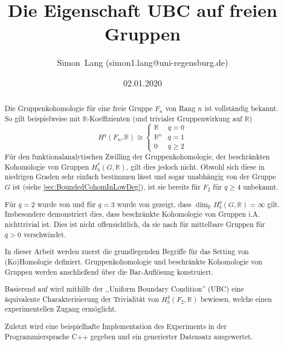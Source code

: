 \documentclass[a4paper,twoside,10pt]{scrreprt}
\author{Simon~Lang (\textsf{simon1.lang@uni-regensburg.de})}
\date{02.01.2020}
\title{Die Eigenschaft UBC auf freien Gruppen}
\newcommand{\R}{\mathbb{R}}
\theoremstyle{definition}
\begin{document}
\maketitle
\begin{abstract}
Die Gruppenkohomologie für eine freie Gruppe $F_n$ von Rang $n$ ist vollständig bekannt. So gilt beispielweise mit $\R$-Koeffizienten (und trivialer Gruppenwirkung auf $\R$)
\begin{equation*}
H^q(F_n,\R)\cong
\begin{cases} 
      \R & q=0 \\
      \R^n & q=1 \\
      0 & q\geq 2
\end{cases}
\end{equation*}
Für den funktionalanalytischen Zwilling der Gruppenkohomologie, der beschränkten Kohomologie von Gruppen $H_b^*(G,\R)$, gilt dies jedoch nicht. Obwohl sich diese in niedrigen Graden sehr einfach bestimmen lässt und sogar unabhängig von der Gruppe $G$ ist (siehe \cref{sec:BoundedCohomInLowDeg}), ist sie bereits für $F_2$ für $q\geq 4$ unbekannt. \par
Für $q=2$ wurde von \autocite{mitsumatsu} und für $q=3$ wurde von \autocite{soma} gezeigt, dass $\dim_{\R} H_b^q(G,\R)=\infty$ gilt. Insbesondere demonstriert dies, dass beschränkte Kohomologie von Gruppen i.A. nichttrivial ist. Dies ist nicht offensichtlich, da sie nach \cite{gromov} für mittelbare Gruppen für $q>0$ verschwindet.\par
In dieser Arbeit werden zuerst die grundlegenden Begriffe für das  Setting von (Ko)Homologie definiert. Gruppenkohomologie und beschränkte Kohomologie von Gruppen werden anschließend über die Bar-Auflösung konstruiert.\par
Basierend auf \cite[Theorem 2.8]{matsumoto} wird mithilfe der ,,Uniform Boundary Condition'' (UBC) eine äquivalente Charakterisierung der Trivialität von $H_b^4(F_2,\R)$ bewiesen, welche einen experimentellen Zugang ermöglicht.\par
Zuletzt wird eine beispielhafte Implementation des Experiments in der Programmiersprache C++ gegeben und ein generierter Datensatz ausgewertet.
\end{abstract}
\tableofcontents
\newpage
{}
\end{document}
